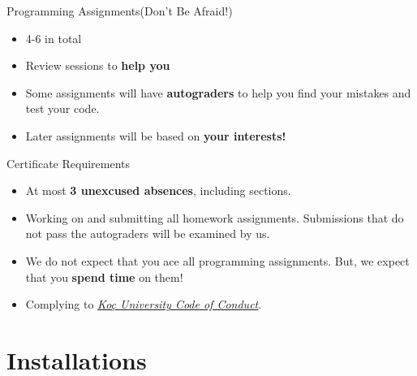 		\begin{frame}{Programming Assignments(Don't Be Afraid!)}
			\pause
			\begin{itemize}
				\LARGE
				\item 4-6 in total
				\pause
				\item Review sessions to \textbf{help you}
				\pause
				\item Some assignments will have \textbf{autograders} to help you find your mistakes and test your code.
				\pause
				\item Later assignments will be based on \textbf{your interests!}
				\pause
			\end{itemize}
			{
			
				\begin{center}
				\end{center}
			}
			
		\end{frame}

		\begin{frame}{Certificate Requirements}
			\pause
			\begin{itemize}
				\LARGE
				\item At most \textbf{3 unexcused absences}, including sections.
				\pause
				\item Working on and submitting all homework assignments. Submissions that do not pass the autograders will be examined by us.
				\pause
				\item We do not expect that you ace all programming assignments. But, we expect that you \textbf{spend time} on them!
				\pause
				\item Complying to \href{https://vpaa.ku.edu.tr/academic/student-code-of-conduct}{\underline{\textit{Koç University Code of Conduct}}}. 
			\end{itemize}
		\end{frame}

	\section{Installations}

